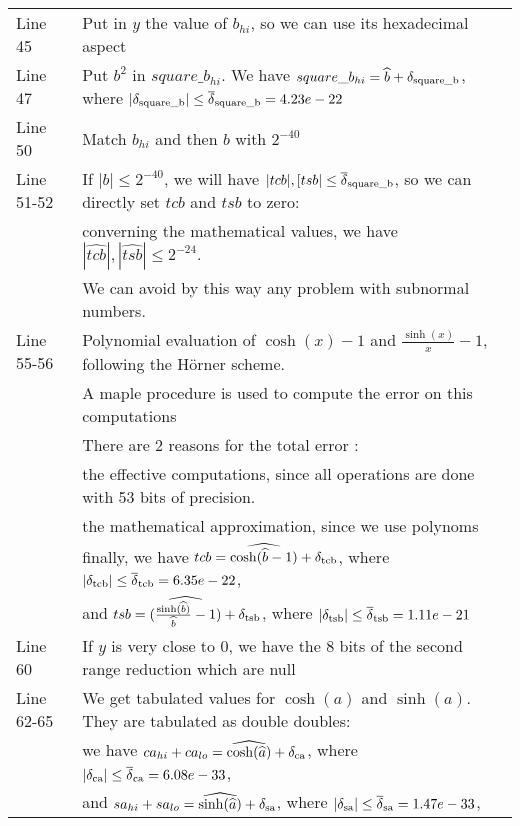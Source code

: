 \begin{tabular}{ll}
Line 45 & Put in $y$ the value of $b_{hi}$, so we can use its hexadecimal aspect \\
Line 47    & Put $b^2$ in $square\_b_{hi}$. We have $square\_b_{hi} = \widehat{b} + \delta_{\mathrm{square\_b}}$, where $|\delta_{\mathrm{square\_b}}| \leq {\overline{\delta}}_{\mathrm{square\_b}} = 4.23e-22$ \\
Line 50    & Match $b_{hi}$ and then $b$ with $2^{-40}$\\
Line 51-52 & If $|b| \leq 2^{-40}$, we will have $|tcb|,[tsb| \leq {\overline{\delta}}_{\mathrm{square\_b}}$, so we can directly set $tcb$ and $tsb$ to zero: \\
           & converning the mathematical values, we have $|\widehat{tcb}|, |\widehat{tsb}| \leq 2^{-24}$. \\
           & We can avoid by this way any problem with subnormal numbers. \\
Line 55-56 & Polynomial evaluation of $\cosh(x)-1$ and $\frac{\sinh(x)}{x}-1$, following the Hörner scheme. \\
           & A maple procedure is used to compute the error on this computations\\
           & There are 2 reasons for the total error :\\
           & the effective computations, since all operations are done with 53 bits of precision.\\
           & the mathematical approximation, since we use polynoms \\
           & finally, we have $tcb = \widehat{\cosh(\widehat{b}-1)} + \delta_{\mathrm{tcb}}$, where $|\delta_{\mathrm{tcb}}| \leq {\overline{\delta}}_{\mathrm{tcb}} = 6.35e-22$, \\
           & and $tsb = \widehat{(\frac{\sinh(\widehat{b})}{\widehat{b}}-1)} + \delta_{\mathrm{tsb}}$, where $|\delta_{\mathrm{tsb}}| \leq {\overline{\delta}}_{\mathrm{tsb}} = 1.11e-21$ \\
Line 60    & If $y$ is very close to $0$, we have the 8 bits of the second range reduction which are null \\
Line 62-65 & We get tabulated values for $\cosh(a)$ and $\sinh(a)$. They are tabulated as double doubles: \\
           & we have $ca_{hi} + ca_{lo} = \widehat{\cosh(\widehat{a})} + \delta_{\mathrm{ca}}$, where $|\delta_{\mathrm{ca}}| \leq {\overline{\delta}}_{\mathrm{ca}} = 6.08e-33$, \\
           & and $sa_{hi} + sa_{lo} = \widehat{\sinh(\widehat{a})} + \delta_{\mathrm{sa}}$, where $|\delta_{\mathrm{sa}}| \leq {\overline{\delta}}_{\mathrm{sa}} = 1.47e-33$, \\

\end{tabular}
